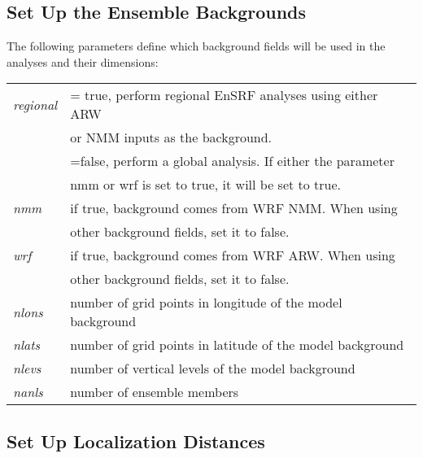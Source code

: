 \subsection{Set Up the Ensemble Backgrounds}

The following parameters define which background fields will be used in the analyses and their dimensions:
\begin{table}[htbp]
\centering
\begin{tabular}{ll}

\textit{regional}   &  = true, perform regional EnSRF analyses using either ARW \\
                &  or NMM inputs as the background.  \\
                 &  =false, perform a global analysis. If either the parameter \\
                  & nmm or wrf is set to true, it will be set to true.  \\

\textit{nmm}   &  if true, background comes from WRF NMM. When using \\
          & other background fields, set it to false. \\

\textit{wrf}   &  if true, background comes from WRF ARW. When using  \\
        &  other background fields, set it to false. \\

\textit{nlons}  &  number of grid points in longitude of the model background  \\ 

\textit{nlats}   & number of grid points in latitude of the model background \\

\textit{nlevs}  & number of vertical levels of the model background \\

\textit{nanls}  &  number of ensemble members \\
          
\end{tabular}
\end{table}

\subsection{Set Up Localization Distances}

